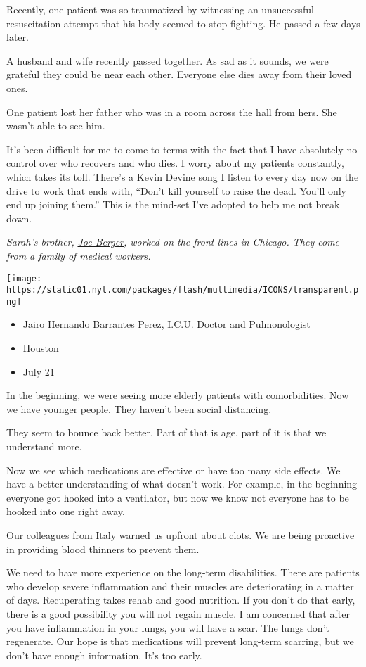 Recently, one patient was so traumatized by witnessing an unsuccessful
resuscitation attempt that his body seemed to stop fighting. He passed a
few days later.

A husband and wife recently passed together. As sad as it sounds, we
were grateful they could be near each other. Everyone else dies away
from their loved ones.

One patient lost her father who was in a room across the hall from hers.
She wasn't able to see him.

It's been difficult for me to come to terms with the fact that I have
absolutely no control over who recovers and who dies. I worry about my
patients constantly, which takes its toll. There's a Kevin Devine song I
listen to every day now on the drive to work that ends with, ``Don't
kill yourself to raise the dead. You'll only end up joining them.'' This
is the mind-set I've adopted to help me not break down.

\emph{Sarah's brother,}
\emph{\href{https://www.nytimes.com/interactive/2020/world/coronavirus-health-care-workers.html\#item-joe-berger}{Joe
Berger}, worked on the front lines in Chicago. They come from a family
of medical workers.}

\texttt{[image: https://static01.nyt.com/packages/flash/multimedia/ICONS/transparent.png]}

\begin{itemize}
\tightlist
\item
  Jairo Hernando Barrantes Perez, I.C.U. Doctor and Pulmonologist
\item
  Houston
\item
  July 21
\end{itemize}

In the beginning, we were seeing more elderly patients with
comorbidities. Now we have younger people. They haven't been social
distancing.

They seem to bounce back better. Part of that is age, part of it is that
we understand more.

Now we see which medications are effective or have too many side
effects. We have a better understanding of what doesn't work. For
example, in the beginning everyone got hooked into a ventilator, but now
we know not everyone has to be hooked into one right away.

Our colleagues from Italy warned us upfront about clots. We are being
proactive in providing blood thinners to prevent them.

We need to have more experience on the long-term disabilities. There are
patients who develop severe inflammation and their muscles are
deteriorating in a matter of days. Recuperating takes rehab and good
nutrition. If you don't do that early, there is a good possibility you
will not regain muscle. I am concerned that after you have inflammation
in your lungs, you will have a scar. The lungs don't regenerate. Our
hope is that medications will prevent long-term scarring, but we don't
have enough information. It's too early.

